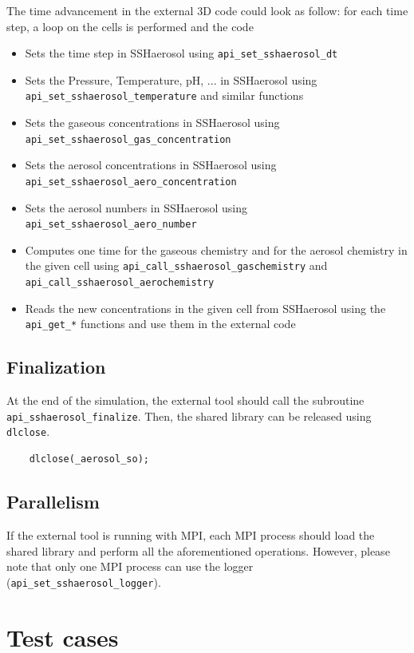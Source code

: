 \documentclass[a4paper,11pt]{article}
\begin{document}
The time advancement in the external 3D code could look as follow: for each time step, a loop on the cells is performed and the code
\begin{itemize}
\item Sets the time step in SSHaerosol using \texttt{api\_set\_sshaerosol\_dt}
\item Sets the Pressure, Temperature, pH, ... in SSHaerosol using \texttt{api\_set\_sshaerosol\_temperature} and similar functions
\item Sets the gaseous concentrations in SSHaerosol using \texttt{api\_set\_sshaerosol\_gas\_concentration}
\item Sets the aerosol concentrations in SSHaerosol using \texttt{api\_set\_sshaerosol\_aero\_concentration}
\item Sets the aerosol numbers in SSHaerosol using \texttt{api\_set\_sshaerosol\_aero\_number}
\item Computes one time for the gaseous chemistry and for the aerosol chemistry in the given cell using \texttt{api\_call\_sshaerosol\_gaschemistry} and \texttt{api\_call\_sshaerosol\_aerochemistry}
\item Reads the new concentrations in the given cell from SSHaerosol using the \texttt{api\_get\_*} functions and use them in the external code
\end{itemize}

\subsection*{Finalization}

At the end of the simulation, the external tool should call the subroutine \texttt{api\_sshaerosol\_finalize}.
Then, the shared library can  be released using \texttt{dlclose}.
\begin{verbatim}
    dlclose(_aerosol_so);
\end{verbatim}

\subsection*{Parallelism}
If the external tool is running with MPI, each MPI process should load the shared library and perform all the aforementioned operations.
However, please note that only one MPI process can use the logger (\texttt{api\_set\_sshaerosol\_logger}).

\section{Test cases}
\end{document}
